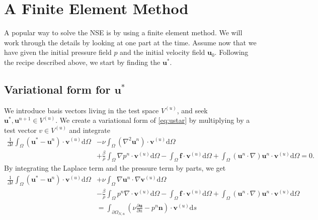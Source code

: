 \documentclass[a4paper,10pt]{article}
\renewcommand{\vec}[1]{\mathbf{#1}}
\renewcommand{\(}{\left(}
\renewcommand{\)}{\right)}
\newcommand{\dm}[1]{\text{d}#1}
\newcommand{\dpart}[2]{\frac{\partial#1}{\partial#2}}
\begin{document}
\section{A Finite Element Method}
A popular way to solve the NSE is by using a finite element method. We will work through the details by looking at one part at the time. Assume now that we have given the initial pressure field $p$ and the initial velocity field $\vec u_0$. Following the recipe described above, we start by finding the $\vec u^*$. 
\subsection{Variational form for $\vec u^*$}
We introduce basis vectors living in the test space $V^{(u)}$, and seek $\vec u^*, \vec u^{n+1} \in V^{(u)}$. We create a variational form of \eqref{eq:ustar} by multiplying by a test vector $v\in V^{(u)}$ and integrate
\begin{align*}
  \frac{1}{\Delta t}\int_\Omega(\vec u^* - \vec u^{n})\cdot\vec v^{(u)}\dm \Omega
  &- \nu\int_\Omega (\nabla^2\vec u^n)\cdot\vec v^{(u)} \dm \Omega\\
   &+ \frac{\beta}{\rho}\int_\Omega\nabla p^n \cdot\vec v^{(u)} \dm \Omega 
   - \int_\Omega\vec f\cdot\vec v^{(u)} \dm \Omega 
   + \int_\Omega(\vec u^n\cdot \nabla)\vec u^n\cdot\vec v^{(u)} \dm \Omega = 0.
\end{align*}
By integrating the Laplace term and the pressure term by parts, we get
\begin{align*}
  \frac{1}{\Delta t}\int_\Omega(\vec u^* - \vec u^{n})\cdot\vec v^{(u)}\dm \Omega
  &+ \nu\int_\Omega\nabla\vec u^n\cdot\nabla\vec v^{(u)} \dm \Omega\\
   &- \frac{\beta}{\rho}\int_\Omega p^n \nabla\cdot\vec v^{(u)} \dm \Omega 
   - \int_\Omega\vec f\cdot\vec v^{(u)} \dm \Omega 
   + \int_\Omega (\vec u^n\cdot \nabla)\vec u^n\cdot\vec v^{(u)} \dm \Omega\\
   &= \int_{\partial\Omega_{N,u}} (\nu\dpart{\vec u}{n} - p^n\vec n)\cdot\vec v^{(u)} \dm s
\end{align*}
\end{document}
